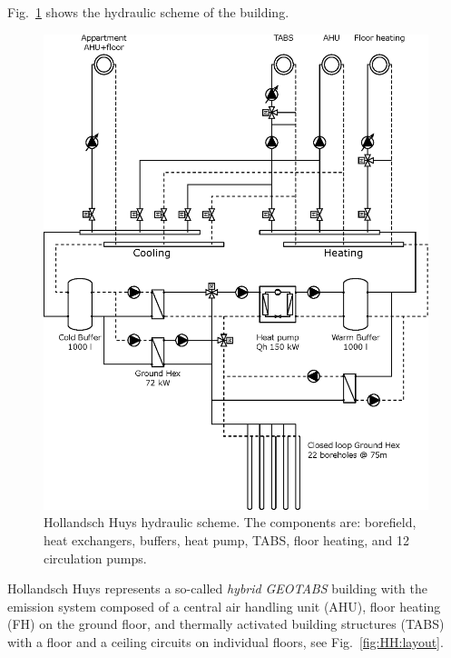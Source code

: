 \documentclass[10pt]{article}
\begin{document}
% 
Fig.~\ref{fig:HH_HVAC} shows the hydraulic scheme of the building.
\begin{figure}[!htbp]
\centering
\includegraphics[width=0.50 \textwidth]{fig/HH_HVAC.eps}
\caption{Hollandsch Huys hydraulic scheme. The components are:  borefield, heat exchangers, 
buffers,  heat pump, TABS,  floor heating, and 12 circulation pumps.
}
\label{fig:HH_HVAC}
\end{figure}
% 
Hollandsch Huys represents a so-called \textit{hybrid} \textit{GEOTABS} building with
the emission system  composed of a central air handling  unit (AHU), floor heating (FH) on the ground floor, and thermally  activated building structures (TABS) with a  floor and a ceiling circuits on individual floors, see Fig.~\ref{fig:HH:layout}. 
\end{document}
